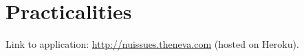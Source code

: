 \section{Practicalities}

Link to application: \url{http://nuissues.theneva.com} (hosted on Heroku).
